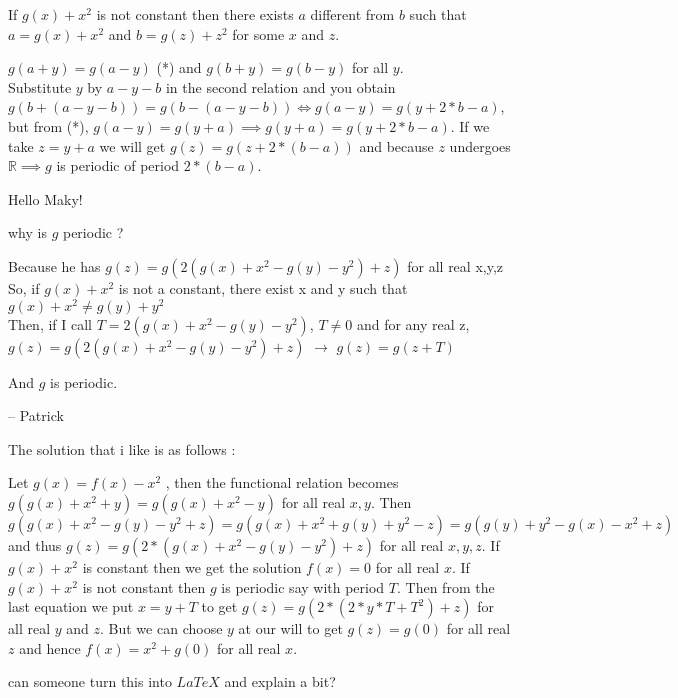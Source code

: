 \begin{mysolution}
	If $g(x) + x^2$ is not constant then there exists $a$ different from $b$ such that $a=g(x)+x^2$ and $b=g(z)+z^2$ for some $x$ and $z$.

 $g(a+y)=g(a-y)$ (*) and $g(b+y)=g(b-y)$ for all $y$. \\
Substitute $y$ by $a-y-b$ in the second relation and you obtain $g(b+(a-y-b))=g(b-(a-y-b)) \iff g(a-y)=g(y+2*b-a)$, but from (*), $g(a-y)=g(y+a) \implies g(y+a)=g(y+2*b-a)$.
 If we take $z = y+a$ we will get  $g(z) = g(z+2*(b-a))$ and because $z$ undergoes $\mathbb{R} \implies g$ is periodic of period $2*(b-a)$. 
\end{mysolution}



\begin{mysolution}
	Hello Maky!

\begin{tcolorbox}why is $g$ periodic ?\end{tcolorbox}

Because he has $g(z)=g(2(g(x)+x^{2}-g(y)-y^{2})+z)$ for all real x,y,z
So, if $g(x)+x^{2}$ is not a constant, there exist x and y such that $g(x)+x^{2}\neq g(y)+y^{2}$ \\
Then, if I call $T=2(g(x)+x^{2}-g(y)-y^{2})$, $T\neq 0$ and for any real z, $g(z)=g(2(g(x)+x^{2}-g(y)-y^{2})+z)$ $\rightarrow$ $g(z)=g(z+T)$

And $g$ is periodic.

-- 
Patrick
\end{mysolution}



\begin{mysolution}
	\begin{tcolorbox}The solution that i like is as follows :

Let $g(x)=f(x)-x^2$ , then the functional relation becomes $g(g(x)+x^2+y)=g(g(x)+x^2-y)$ for all real $x,y$. Then \[g(g(x)+x^2-g(y)-y^2+z)=g(g(x)+x^2+g(y)+y^2-z)=g(g(y)+y^2-g(x)-x^2+z)\] and thus
$g(z)=g(2*(g(x)+x^2-g(y)-y^2) +z)$ for all real $x,y,z$. If $g(x)+x^2$ is constant then we get the solution $f(x)=0$ for all real $x$. If $g(x)+x^2$ is not constant then $g$ is periodic say with period $T$. Then from the last equation we put $x=y+T$ to get $g(z)=g(2*(2*y*T+T^2)+z)$ for all real $y$ and $z$. But we can choose $y$ at our will to get $g(z)=g(0)$ for all real $z$ and hence $f(x)=x^2+g(0)$ for all real $x$.\end{tcolorbox}

can someone turn this into $LaTeX$ and explain a bit?
\end{mysolution}



